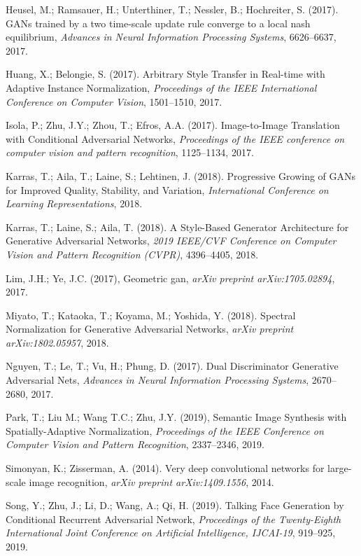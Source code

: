 \documentclass[11pt,a4paper]{article}
\begin{document}
\begin{thebibliography}{11}
 Heusel, M.; Ramsauer, H.; Unterthiner, T.; Nessler, B.; Hochreiter, S. (2017).
 GANs trained by a two time-scale update rule converge to a local nash equilibrium,
 \emph{Advances in Neural Information Processing Systems},
 6626--6637, 2017.

 Huang, X.; Belongie, S. (2017).
 Arbitrary Style Transfer in Real-time with Adaptive Instance Normalization,
 \emph{Proceedings of the IEEE International Conference on Computer Vision},
 1501--1510, 2017.

 Isola, P.; Zhu, J.Y.; Zhou, T.; Efros, A.A. (2017).
 Image-to-Image Translation with Conditional Adversarial Networks,
 \emph{Proceedings of the IEEE conference on computer vision and pattern recognition},
 1125--1134, 2017.
 
 Karras, T.; Aila, T.; Laine, S.; Lehtinen, J. (2018).
 Progressive Growing of {GAN}s for Improved Quality, Stability, and Variation,
 \emph{International Conference on Learning Representations},
 2018.
 
 Karras, T.; Laine, S.; Aila, T. (2018).
 A Style-Based Generator Architecture for Generative Adversarial Networks,
 \emph{2019 IEEE/CVF Conference on Computer Vision and Pattern Recognition (CVPR)},
 4396--4405, 2018.
 
 Lim, J.H.; Ye, J.C. (2017),
 Geometric gan,
 \emph{arXiv preprint arXiv:1705.02894},
 2017.
 
 Miyato, T.; Kataoka, T.; Koyama, M.; Yoshida, Y. (2018).
 Spectral Normalization for Generative Adversarial Networks,
 \emph{arXiv preprint arXiv:1802.05957},
 2018.

 Nguyen, T.; Le, T.; Vu, H.; Phung, D. (2017).
 Dual Discriminator Generative Adversarial Nets,
 \emph{Advances in Neural Information Processing Systems},
 2670--2680, 2017.

 Park, T.; Liu M.; Wang T.C.; Zhu, J.Y. (2019),
 Semantic Image Synthesis with Spatially-Adaptive Normalization,
 \emph{Proceedings of the IEEE Conference on Computer Vision and Pattern Recognition},
 2337--2346, 2019.
 
 Simonyan, K.; Zisserman, A. (2014).
 Very deep convolutional networks for large-scale image recognition,
 \emph{arXiv preprint arXiv:1409.1556},
 2014.

 Song, Y.; Zhu, J.; Li, D.; Wang, A.; Qi, H. (2019).
 Talking Face Generation by Conditional Recurrent Adversarial Network,
 \emph{Proceedings of the Twenty-Eighth International Joint Conference on Artificial Intelligence, IJCAI-19},
 919--925, 2019.


\end{thebibliography}
\end{document}
